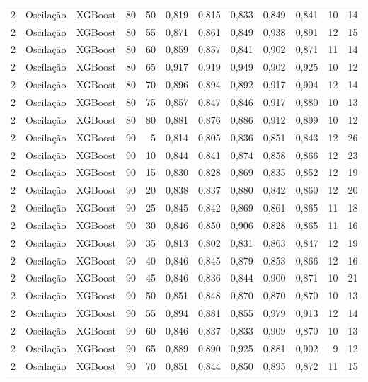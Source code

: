 \begin{longtable}{@{}rllrrrrrrrrr@{}}
2 & Oscilação & XGBoost & 80 & 50 & 0,819 & 0,815 & 0,833 & 0,849 & 0,841 & 10 & 14 \\
2 & Oscilação & XGBoost & 80 & 55 & 0,871 & 0,861 & 0,849 & 0,938 & 0,891 & 12 & 15 \\
2 & Oscilação & XGBoost & 80 & 60 & 0,859 & 0,857 & 0,841 & 0,902 & 0,871 & 11 & 14 \\
2 & Oscilação & XGBoost & 80 & 65 & 0,917 & 0,919 & 0,949 & 0,902 & 0,925 & 10 & 12 \\
2 & Oscilação & XGBoost & 80 & 70 & 0,896 & 0,894 & 0,892 & 0,917 & 0,904 & 12 & 14 \\
2 & Oscilação & XGBoost & 80 & 75 & 0,857 & 0,847 & 0,846 & 0,917 & 0,880 & 10 & 13 \\
2 & Oscilação & XGBoost & 80 & 80 & 0,881 & 0,876 & 0,886 & 0,912 & 0,899 & 10 & 12 \\
2 & Oscilação & XGBoost & 90 & 5 & 0,814 & 0,805 & 0,836 & 0,851 & 0,843 & 12 & 26 \\
2 & Oscilação & XGBoost & 90 & 10 & 0,844 & 0,841 & 0,874 & 0,858 & 0,866 & 12 & 23 \\
2 & Oscilação & XGBoost & 90 & 15 & 0,830 & 0,828 & 0,869 & 0,835 & 0,852 & 12 & 19 \\
2 & Oscilação & XGBoost & 90 & 20 & 0,838 & 0,837 & 0,880 & 0,842 & 0,860 & 12 & 20 \\
2 & Oscilação & XGBoost & 90 & 25 & 0,845 & 0,842 & 0,869 & 0,861 & 0,865 & 11 & 18 \\
2 & Oscilação & XGBoost & 90 & 30 & 0,846 & 0,850 & 0,906 & 0,828 & 0,865 & 11 & 16 \\
2 & Oscilação & XGBoost & 90 & 35 & 0,813 & 0,802 & 0,831 & 0,863 & 0,847 & 12 & 19 \\
2 & Oscilação & XGBoost & 90 & 40 & 0,846 & 0,845 & 0,879 & 0,853 & 0,866 & 12 & 16 \\
2 & Oscilação & XGBoost & 90 & 45 & 0,846 & 0,836 & 0,844 & 0,900 & 0,871 & 10 & 21 \\
2 & Oscilação & XGBoost & 90 & 50 & 0,851 & 0,848 & 0,870 & 0,870 & 0,870 & 10 & 13 \\
2 & Oscilação & XGBoost & 90 & 55 & 0,894 & 0,881 & 0,855 & 0,979 & 0,913 & 12 & 14 \\
2 & Oscilação & XGBoost & 90 & 60 & 0,846 & 0,837 & 0,833 & 0,909 & 0,870 & 10 & 13 \\
2 & Oscilação & XGBoost & 90 & 65 & 0,889 & 0,890 & 0,925 & 0,881 & 0,902 & 9 & 12 \\
2 & Oscilação & XGBoost & 90 & 70 & 0,851 & 0,844 & 0,850 & 0,895 & 0,872 & 11 & 15 \\

\end{longtable}
